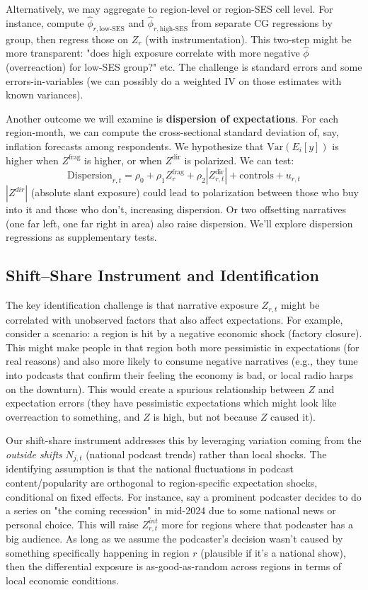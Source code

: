 \documentclass[12pt]{article}
\begin{document}
Alternatively, we may aggregate to region-level or region-SES cell level. For instance, compute $\hat{\phi}_{r, \text{low-SES}}$ and $\hat{\phi}_{r, \text{high-SES}}$ from separate CG regressions by group, then regress those on $Z_r$ (with instrumentation). This two-step might be more transparent: "does high exposure correlate with more negative $\hat{\phi}$ (overreaction) for low-SES group?" etc. The challenge is standard errors and some errors-in-variables (we can possibly do a weighted IV on those estimates with known variances).

Another outcome we will examine is \textbf{dispersion of expectations}. For each region-month, we can compute the cross-sectional standard deviation of, say, inflation forecasts among respondents. We hypothesize that $\text{Var}(E_{i}[y])$ is higher when $Z^{\text{frag}}$ is higher, or when $Z^{\text{dir}}$ is polarized. We can test:
$$
    \text{Dispersion}_{r,t}=\rho_0+\rho_1 Z_r^\text{frag} + \rho_2 |Z_{r,t}^\text{dir}| + \text{controls}+u_{r,t}
$$
$|Z^{dir}|$ (absolute slant exposure) could lead to polarization between those who buy into it and those who don't, increasing dispersion. Or two offsetting narratives (one far left, one far right in area) also raise dispersion. We'll explore dispersion regressions as supplementary tests.

\subsection{Shift--Share Instrument and Identification}
The key identification challenge is that narrative exposure $Z_{r,t}$ might be correlated with unobserved factors that also affect expectations. For example, consider a scenario: a region is hit by a negative economic shock (factory closure). This might make people in that region both more pessimistic in expectations (for real reasons) and also more likely to consume negative narratives (e.g., they tune into podcasts that confirm their feeling the economy is bad, or local radio harps on the downturn). This would create a spurious relationship between $Z$ and expectation errors (they have pessimistic expectations which might look like overreaction to something, and $Z$ is high, but not because $Z$ caused it).

Our shift-share instrument addresses this by leveraging variation coming from the \textit{outside shifts} $N_{j,t}$ (national podcast trends) rather than local shocks. The identifying assumption is that the national fluctuations in podcast content/popularity are orthogonal to region-specific expectation shocks, conditional on fixed effects. For instance, say a prominent podcaster decides to do a series on "the coming recession" in mid-2024 due to some national news or personal choice. This will raise $Z^{int}_{r,t}$ more for regions where that podcaster has a big audience. As long as we assume the podcaster's decision wasn't caused by something specifically happening in region $r$ (plausible if it's a national show), then the differential exposure is as-good-as-random across regions in terms of local economic conditions.
\end{document}
